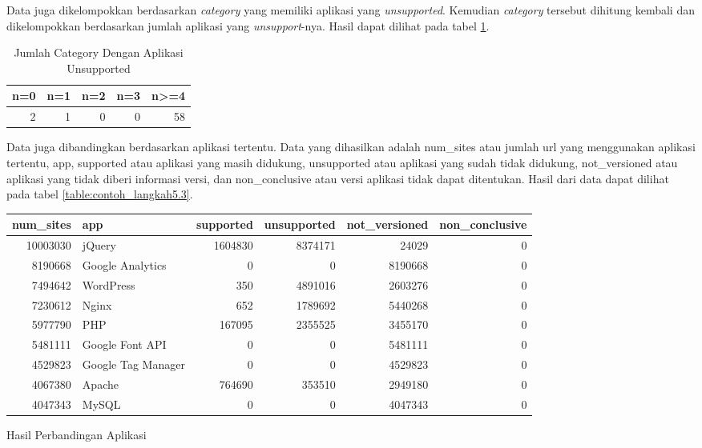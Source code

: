Data juga dikelompokkan berdasarkan \textit{category} yang memiliki aplikasi yang \textit{unsupported}. Kemudian \textit{category} tersebut dihitung kembali dan dikelompokkan berdasarkan jumlah aplikasi yang \textit{unsupport}-nya. Hasil dapat dilihat pada tabel \ref{table:contoh_langkah5.2}.
\begin{table}[H]
\centering
\begin{tabular}{|r|r|r|r|r|}
	\hline
	\textbf{n=0} & \textbf{n=1} & \textbf{n=2} & \textbf{n=3} & \textbf{n>=4}\\
	\hline
	2 & 1 & 0 & 0 & 58\\
	\hline
\end{tabular}
\caption{Jumlah Category Dengan Aplikasi Unsupported}
\label{table:contoh_langkah5.2}
\end{table}

Data juga dibandingkan berdasarkan aplikasi tertentu. Data yang dihasilkan adalah num\_sites atau jumlah url yang menggunakan aplikasi tertentu, app, supported atau aplikasi yang masih didukung, unsupported atau aplikasi yang sudah tidak didukung, not\_versioned atau aplikasi yang tidak diberi informasi versi, dan non\_conclusive atau versi aplikasi tidak dapat ditentukan. Hasil dari data dapat dilihat pada tabel \ref{table:contoh_langkah5.3}.
\begin{adjustwidth}{-2.5 cm}{-2.5 cm}\centering\begin{threeparttable}[!htb]
	\begin{tabular}{|r|l|r|r|r|r|}
		\hline
		\textbf{num\_sites} & \textbf{app} & \textbf{supported} & \textbf{unsupported} & \textbf{not\_versioned} & \textbf{non\_conclusive}\\
		\hline
		10003030 &jQuery &1604830 &8374171 &24029 &0 \\
		\hline
		8190668 &Google Analytics &0 &0 &8190668 &0 \\
		\hline
		7494642 &WordPress &350 &4891016 &2603276 &0 \\
		\hline
		7230612 &Nginx &652 &1789692 &5440268 &0 \\
		\hline
		5977790 &PHP &167095 &2355525 &3455170 &0 \\
		\hline
		5481111 &Google Font API &0 &0 &5481111 &0 \\
		\hline
		4529823 &Google Tag Manager &0 &0 &4529823 &0 \\
		\hline
		4067380 &Apache &764690 &353510 &2949180 &0 \\
		\hline
		4047343 &MySQL &0 &0 &4047343 &0 \\
		\hline
	\end{tabular}
	\caption{Hasil Perbandingan Aplikasi}
	\label{table:contoh_langkah5.3}
\end{threeparttable}\end{adjustwidth}


